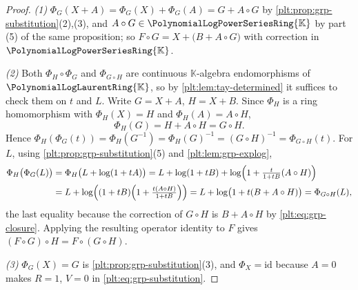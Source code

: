 \documentclass[11pt,oneside]{article}
\theoremstyle{plain}
\theoremstyle{definition}
\theoremstyle{remark}
\newcommand{\K}{\mathbb{K}}
\newcommand{\PLpow}{\PolynomialLogPowerSeriesRing{\K}}   %
\newcommand{\PLlau}{\PolynomialLogLaurentRing{\K}}       %
\newcommand{\compose}{\mathbin{\circ}}
\begin{document}
\begin{proof}
\emph{(1)} \(\Phi_G(X+A)=\Phi_G(X)+\Phi_G(A)=G+A\compose G\) by
\cref{plt:prop:grp-substitution}(2),(3), and
\(A\compose G\in\PLpow\) by part (5) of the same proposition; so
\(F\compose G=X+\bigl(B+A\compose G\bigr)\) with correction in \(\PLpow\).

\emph{(2)} Both \(\Phi_H\circ\Phi_G\) and \(\Phi_{G\compose H}\) are
continuous \(\K\)-algebra endomorphisms of \(\PLlau\), so by
\cref{plt:lem:tay-determined} it suffices to check them on \(t\)
and \(L\).  Write \(G=X+A\), \(H=X+B\).  Since \(\Phi_H\) is a ring
homomorphism with \(\Phi_H(X)=H\) and \(\Phi_H(A)=A\compose H\),
\begin{equation}\label{plt:eq:grp-phi-of-G}
  \Phi_H(G)=H+A\compose H=G\compose H .
\end{equation}
Hence
\(\Phi_H(\Phi_G(t))=\Phi_H(G^{-1})=\Phi_H(G)^{-1}=(G\compose H)^{-1}
 =\Phi_{G\compose H}(t)\).
For \(L\), using \cref{plt:prop:grp-substitution}(5) and
\cref{plt:lem:grp-explog},
\begin{align*}
  \Phi_H\bigl(\Phi_G(L)\bigr)
  &=\Phi_H\bigl(L+\log(1+tA)\bigr)
   =L+\log(1+tB)+\log\Bigl(1+\tfrac{t}{1+tB}(A\compose H)\Bigr)\\
  &=L+\log\Bigl((1+tB)\Bigl(1+\tfrac{t(A\compose H)}{1+tB}\Bigr)\Bigr)
   =L+\log\bigl(1+t(B+A\compose H)\bigr)
   =\Phi_{G\compose H}(L),
\end{align*}
the last equality because the correction of \(G\compose H\) is
\(B+A\compose H\) by \eqref{plt:eq:grp-closure}.  Applying the resulting
operator identity to \(F\) gives
\((F\compose G)\compose H=F\compose(G\compose H)\).


\emph{(3)} \(\Phi_G(X)=G\) is \cref{plt:prop:grp-substitution}(3), and
\(\Phi_X=\mathrm{id}\) because \(A=0\) makes \(R=1\), \(V=0\) in
\eqref{plt:eq:grp-substitution}.


\end{proof}
\end{document}
